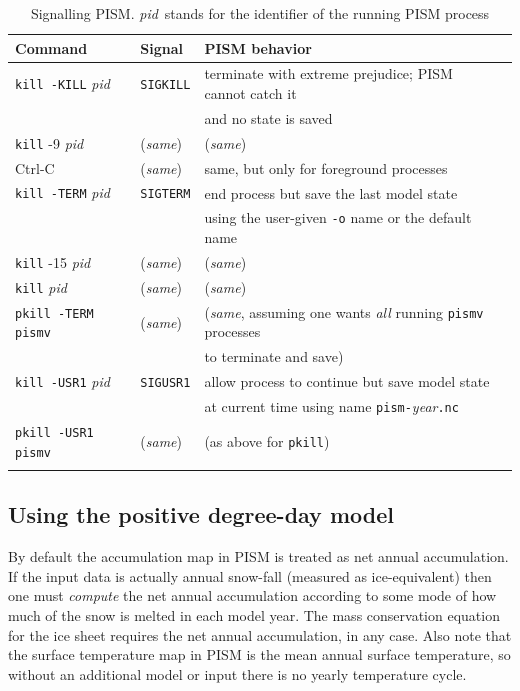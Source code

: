 \documentclass[11pt,final]{amsart}
\begin{document}
\newcommand\pid{\textsl{pid}}
\newcommand\same{(\textsl{same})}
\begin{table}[h]
\caption{Signalling PISM.  \pid~stands for the identifier of the running PISM process}\label{tab:signals}
\begin{tabular}{@{}llll}\hline
\textbf{Command}\phantom{bobbob} & \textbf{Signal}\phantom{bobbob} & \textbf{PISM behavior} \\ \hline
\texttt{kill -KILL} \pid & \texttt{SIGKILL} & terminate with extreme prejudice; PISM cannot catch it \\
 & & and no state is saved \\
\texttt{kill} -9 \pid & \same & \same \\
Ctrl-C & \same & same, but only for foreground processes  \\ \hline
\texttt{kill -TERM} \pid & \texttt{SIGTERM} & end process but save the last model state \\
 &  & using the user-given \verb|-o| name or the default name \\
\texttt{kill} -15 \pid & \same & \same \\
\texttt{kill} \pid & \same & \same \\
\texttt{pkill -TERM pismv} & \same & (\emph{same}, assuming one wants \emph{all} running \verb|pismv| processes \\ 
 &  & to terminate and save) \\ \hline
\texttt{kill -USR1} \pid & \texttt{SIGUSR1} & allow process to continue but save model state \\
 &  & at current time using name \texttt{pism-}\textsl{year}\texttt{.nc} \\
\texttt{pkill -USR1 pismv} & \same & (as above for \verb|pkill|) \\
\hline\normalsize
\end{tabular}
\end{table}


\subsection{Using the positive degree-day model}  \label{subsect:pdd}  By default the accumulation map in PISM is treated as net annual accumulation.  If the input data is actually annual snow-fall (measured as ice-equivalent) then one must \emph{compute} the net annual accumulation according to some mode of how much of the snow is melted in each model year.  The mass conservation equation for the ice sheet requires the net annual accumulation, in any case.  Also note that the surface temperature map in PISM is the mean annual surface temperature, so without an additional model or input there is no yearly temperature cycle.
\end{document}
